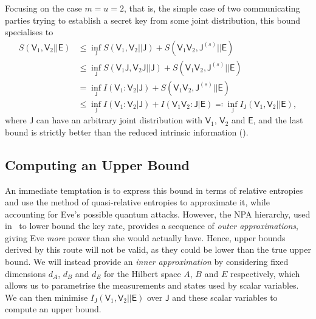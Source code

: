 \documentclass[10pt, a4paper]{article}
\numberwithin{equation}{section} %
\theoremstyle{definition}
\theoremstyle{plain}
\newcommand{\?}{\mathrel{?}} %
\newcommand{\crv}[1]{\mathsf{#1}}
\begin{document}
    \newcommand{\splitkey}[3][\crv{J}]{I_{#1}\left(#2||#3\right)}

    Focusing on the case \(m = u = 2\), that is, the simple case of two communicating parties trying to establish a secret key from some joint distribution, this bound specialises to
    \begin{align}
      S(\crv{V}_1, \crv{V}_2||\crv{E}) &\leq \inf_\crv{J} S(\crv{V}_1, \crv{V}_2||\crv{J}) + S(\crv{V}_1\crv{V}_2, \crv{J}^{(s)}||\crv{E}) \\
                     &\leq \inf_\crv{J} S(\crv{V}_1\crv{J}, \crv{V}_2\crv{J}||\crv{J}) + S(\crv{V}_1\crv{V}_2, \crv{J}^{(s)}||\crv{E}) \\
                     &= \inf_\crv{J} I(\crv{V}_1 : \crv{V}_2|\crv{J}) + S(\crv{V}_1\crv{V}_2, \crv{J}^{(s)}||\crv{E}) \\
                     &\leq \inf_\crv{J} I(\crv{V}_1 : \crv{V}_2|\crv{J}) + I(\crv{V}_1\crv{V}_2 : \crv{J}|\crv{E}) \eqqcolon \inf_{\crv{J}} \splitkey{\crv{V}_1,\crv{V}_2}{\crv{E}},
    \end{align}
    where \(\crv{J}\) can have an arbitrary joint distribution with \(\crv{V}_1\), \(\crv{V}_2\) and \(\crv{E}\), and the last bound is strictly better than the reduced intrinsic information ().

    \subsection{Computing an Upper Bound}

    An immediate temptation is to express this bound in terms of relative entropies and use the method of quasi-relative entropies to approximate it, while accounting for Eve's possible quantum attacks. However, the NPA hierarchy, used in~\cite{BFF_QRE} to lower bound the key rate, provides a seequence of \emph{outer approximations}, giving Eve \emph{more} power than she would actually have. Hence, upper bounds derived by this route will not be valid, as they could be lower than the true upper bound. We will instead provide an \emph{inner approximation} by considering fixed dimensions \(d_A\), \(d_B\) and \(d_E\) for the Hilbert space \(A\), \(B\) and \(E\) respectively, which allows us to parametrise the measurements and states used by scalar variables. We can then minimise \(\splitkey{\crv{V}_1,\crv{V}_2}{\crv{E}}\) over \(\crv{J}\) and these scalar variables to compute an upper bound.
\end{document}
